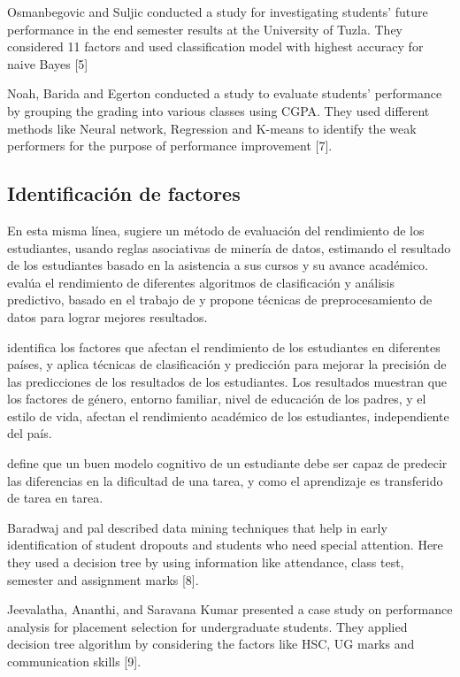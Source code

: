 Osmanbegovic and Suljic conducted a study for investigating students’ future performance in the end semester results at the University of Tuzla. They considered 11 factors and used classification model with highest accuracy for naive Bayes [5]

Noah, Barida and Egerton conducted a study to evaluate students’ performance by grouping the grading into various classes using CGPA. They used different methods like Neural network, Regression and K-means to identify the weak performers for the purpose of performance improvement [7]. 


\subsection*{Identificación de factores}

En esta misma línea, \textcite{borkar2013predicting} sugiere un método de evaluación del rendimiento de los estudiantes, usando reglas asociativas de minería de datos, estimando el resultado de los estudiantes basado en la asistencia a sus cursos y su avance académico. \textcite{shazmeen2013performance} evalúa el rendimiento de diferentes algoritmos de clasificación y análisis predictivo, basado en el trabajo de \textcite{borkar2013predicting} y propone técnicas de preprocesamiento de datos para lograr mejores resultados. 

\textcite{oskouei2014predicting} identifica los factores que afectan el rendimiento de los estudiantes en diferentes países, y aplica técnicas de clasificación y predicción para mejorar la precisión de las predicciones de los resultados de los estudiantes. Los resultados muestran que los factores de género, entorno familiar, nivel de educación de los padres, y el estilo de vida, afectan el rendimiento académico de los estudiantes, independiente del país.

\textcite{koedinger2015data} define que un buen modelo cognitivo de un estudiante debe ser capaz de predecir las diferencias en la dificultad de una tarea, y como el aprendizaje es transferido de tarea en tarea.

Baradwaj and pal described data mining techniques that help in early identification of student dropouts and students who need special attention. Here they used a decision tree by using information like attendance, class test, semester and assignment marks [8]. 

Jeevalatha, Ananthi, and Saravana Kumar presented a case study on performance analysis for placement selection for undergraduate students. They applied decision tree algorithm by considering the factors like HSC, UG marks and communication skills [9]. 

